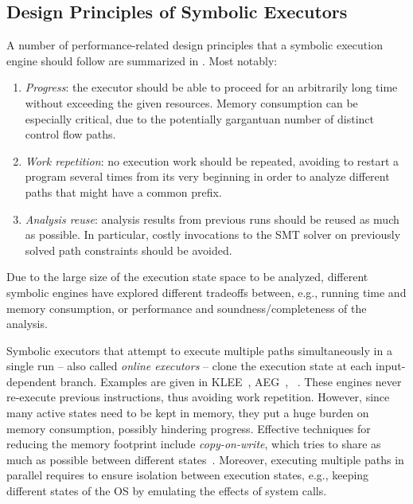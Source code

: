 \subsection{Design Principles of Symbolic Executors}
\label{ss:principles}

A number %
of performance-related design principles that a symbolic execution engine should follow are  summarized in %
\cite{MAYHEM-SP12}. Most notably:
\begin{enumerate}
  \item {\em Progress}: the executor should be able to proceed for an arbitrarily long time without exceeding the given resources. Memory consumption can be especially critical, due to the potentially gargantuan number of distinct control flow paths.
  \item {\em Work repetition}: no execution work should be repeated, avoiding to restart a program several times from its very beginning in order to analyze different paths that might have a  common prefix.
  \item {\em Analysis reuse}: analysis results from previous runs should be reused as much as possible. In particular, costly invocations to the SMT solver on  previously solved path constraints should be avoided.
\end{enumerate}

\noindent Due to the large size of the execution state space to be analyzed, different symbolic engines have explored different tradeoffs between, e.g., running time and memory consumption, or performance and soundness/completeness of the analysis.

Symbolic executors that attempt to execute multiple paths simultaneously in a single run -- also called {\em online executors} -- clone the execution state at each input-dependent branch. Examples are given in {\sc KLEE}~\cite{KLEE-OSDI08}, {\sc AEG}~\cite{AEG-NDSS11}, {\sc \stwoe}~\cite{CKC-TOCS12}. These engines never re-execute previous instructions, thus avoiding work repetition. However, since many active states need to be kept in memory, they put a huge burden on memory consumption, possibly hindering progress. Effective techniques for reducing the memory footprint include {\em copy-on-write}, which tries to share as much as possible between different states~\cite{KLEE-OSDI08}. Moreover, executing multiple paths in parallel requires to ensure isolation between execution states, e.g., keeping different states of the OS by emulating the effects of system calls.

